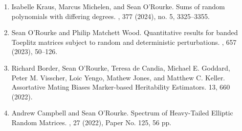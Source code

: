 \documentclass[letterpaper]{article}
\begin{document}
\begin{enumerate}
	\item Isabelle Kraus, Marcus Michelen, and Sean O'Rourke.
	\newblock Sums of random polynomials with differing degrees. 
	,  377 (2024), no. 5, 3325--3355.  
	
	\item Sean O'Rourke and Philip Matchett Wood.
	\newblock Quantitative results for banded Toeplitz matrices subject to random and deterministic perturbations. 
	,  657 (2023), 50--126. 
	
	\item Richard Border, Sean O'Rourke, Teresa de Candia, Michael E. Goddard, Peter M. Visscher, Loic Yengo, Mathew Jones, and Matthew C. Keller. 
	\newblock Assortative Mating Biases Marker-based Heritability Estimators.
	 13, 660 (2022). 
	
	\item Andrew Campbell and Sean O'Rourke.
	\newblock Spectrum of Heavy-Tailed Elliptic Random Matrices.  
	, 27 (2022), Paper No. 125, 56 pp. 
	

\end{enumerate}
\end{document}
